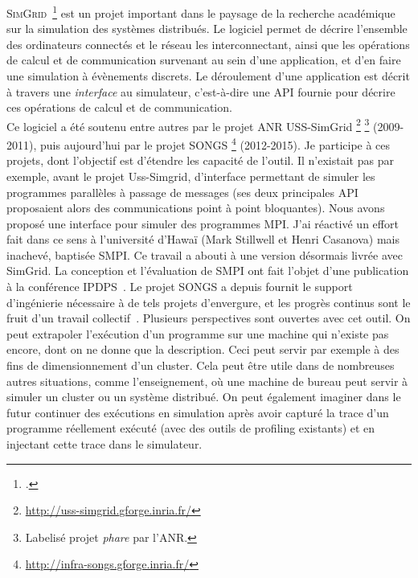 \documentclass[11pt]{article}
\begin{document}
\textsc{SimGrid}~\footcite{Casanova08} est  un projet important dans  le paysage
de  la  recherche académique  sur  la  simulation  des systèmes  distribués.  Le
logiciel permet de décrire l'ensemble des ordinateurs connectés et le réseau les
interconnectant,  ainsi  que  les  opérations  de  calcul  et  de  communication
survenant au sein  d'une application, et d'en faire une  simulation à évènements
discrets.  Le   déroulement  d'une   application  est   décrit  à   travers  une
\emph{interface} au  simulateur, c'est-à-dire une  API fournie pour  décrire ces
opérations de calcul et de communication.\\

Ce logiciel a été soutenu entre autres par le projet ANR USS-SimGrid%
\footnote{\url{http://uss-simgrid.gforge.inria.fr/}} 
\footnote{Labelisé projet \textit{phare} par l'ANR.}
(2009-2011), puis aujourd'hui par le projet SONGS%
\footnote{\url{http://infra-songs.gforge.inria.fr/}} (2012-2015). Je participe à
ces  projets,  dont  l'objectif  est  d'étendre les  capacité  de  l'outil.   Il
n'existait pas par exemple, avant  le projet Uss-Simgrid, d'interface permettant
de simuler les programmes parallèles à passage de messages (ses deux principales
API proposaient alors  des communications point à point  bloquantes). Nous avons
proposé une interface  pour simuler des programmes MPI. J'ai  réactivé un effort
fait dans ce sens à l'université d'Hawaï (Mark Stillwell et Henri Casanova) mais
inachevé, baptisée  SMPI.  Ce travail  a abouti  à une version  désormais livrée
avec SimGrid.   La conception  et l'évaluation  de SMPI  ont fait  l'objet d'une
publication à la conférence IPDPS~\cite{icps-2011-224}. Le projet SONGS a depuis
fournit le support d'ingénierie nécessaire à de tels projets d'envergure, et les
progrès continus sont le  fruit d'un travail collectif~\cite{smpi13}.  Plusieurs
perspectives sont ouvertes avec cet  outil.  On peut extrapoler l'exécution d'un
programme sur  une machine  qui n'existe  pas encore,  dont on  ne donne  que la
description.  Ceci  peut servir par exemple  à des fins de  dimensionnement d'un
cluster.  Cela peut  être  utile  dans de  nombreuses  autres situations,  comme
l'enseignement, où une machine de bureau peut  servir à simuler un cluster ou un
système  distribué. On  peut  également  imaginer dans  le  futur continuer  des
exécutions en simulation après avoir  capturé la trace d'un programme réellement
exécuté (avec  des outils de  profiling existants)  et en injectant  cette trace
dans le simulateur.
\end{document}
